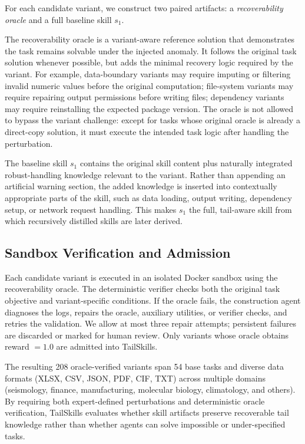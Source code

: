 \documentclass[11pt]{article}
\begin{document}
For each candidate variant, we construct two paired artifacts: a \textit{recoverability oracle} and a full baseline skill $s_1$.

The recoverability oracle is a variant-aware reference solution that demonstrates the task remains solvable under the injected anomaly. It follows the original task solution whenever possible, but adds the minimal recovery logic required by the variant. For example, data-boundary variants may require imputing or filtering invalid numeric values before the original computation; file-system variants may require repairing output permissions before writing files; dependency variants may require reinstalling the expected package version. The oracle is not allowed to bypass the variant challenge: except for tasks whose original oracle is already a direct-copy solution, it must execute the intended task logic after handling the perturbation.

The baseline skill $s_1$ contains the original skill content plus naturally integrated robust-handling knowledge relevant to the variant. Rather than appending an artificial warning section, the added knowledge is inserted into contextually appropriate parts of the skill, such as data loading, output writing, dependency setup, or network request handling. This makes $s_1$ the full, tail-aware skill from which recursively distilled skills are later derived.

\subsection{Sandbox Verification and Admission}

Each candidate variant is executed in an isolated Docker sandbox using the recoverability oracle. The deterministic verifier checks both the original task objective and variant-specific conditions. If the oracle fails, the construction agent diagnoses the logs, repairs the oracle, auxiliary utilities, or verifier checks, and retries the validation. We allow at most three repair attempts; persistent failures are discarded or marked for human review. Only variants whose oracle obtains reward $=1.0$ are admitted into TailSkills.

The resulting 208 oracle-verified variants span 54 base tasks and diverse data formats (XLSX, CSV, JSON, PDF, CIF, TXT) across multiple domains (seismology, finance, manufacturing, molecular biology, climatology, and others). By requiring both expert-defined perturbations and deterministic oracle verification, TailSkills evaluates whether skill artifacts preserve recoverable tail knowledge rather than whether agents can solve impossible or under-specified tasks.
\end{document}
